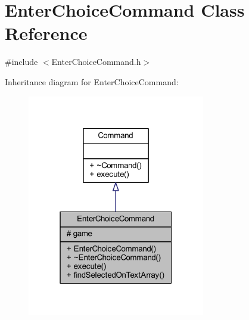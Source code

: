 \hypertarget{class_enter_choice_command}{}\section{Enter\+Choice\+Command Class Reference}
\label{class_enter_choice_command}


{\ttfamily \#include $<$Enter\+Choice\+Command.\+h$>$}



Inheritance diagram for Enter\+Choice\+Command\+:
\nopagebreak
\begin{figure}[H]
\begin{center}
\leavevmode
\includegraphics[width=220pt]{class_enter_choice_command__inherit__graph}
\end{center}
\end{figure}


